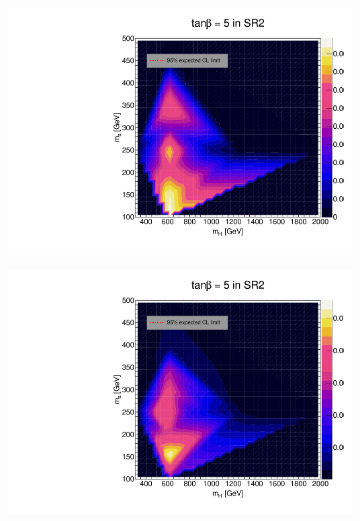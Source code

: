 \documentclass[12pt, a4paper]{book}
\begin{document}
\begin{figure}[!ht]
\begin{subfigure}[b]{0.49\textwidth}
   \end{subfigure}
   \hfill
   \begin{subfigure}[b]{0.49\textwidth}
      \centering
      \includegraphics[width=1\textwidth]{Limits/Model_independent/100-150/2HDM/2HDM_ee_tb5.pdf}
   \end{subfigure}
   \hfill
   \begin{subfigure}[b]{0.49\textwidth}
      \centering
      \includegraphics[width=1\textwidth]{Limits/Model_independent/100-150/2HDM/2HDM_uu_tb5.pdf}
   \end{subfigure}
   \hfill
	\begin{subfigure}[b]{0.49\textwidth}
      \centering

\end{subfigure}
\end{figure}
\end{document}
